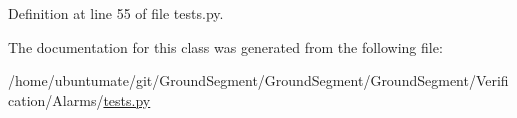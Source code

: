 Definition at line 55 of file tests.\+py.



The documentation for this class was generated from the following file\+:\begin{DoxyCompactItemize}
\item 
/home/ubuntumate/git/\+Ground\+Segment/\+Ground\+Segment/\+Ground\+Segment/\+Verification/\+Alarms/\hyperlink{_verification_2_alarms_2tests_8py}{tests.\+py}\end{DoxyCompactItemize}
